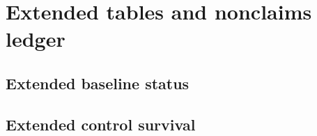 \section{Extended tables and nonclaims ledger}\label{app:extended-material}


\subsection{Extended baseline status}\label{subsec:extended-baseline-status}



\subsection{Extended control survival}\label{subsec:extended-control-survival}



